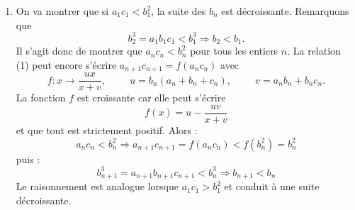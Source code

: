 \begin{enumerate}
\begin{enumerate}
\item On va montrer que si $a_1c_1<b_1^2$, la suite des $b_n$ est décroissante. Remarquons que
\begin{displaymath}
 b_2^3 = a_1b_1c_1 < b_1^3 \Rightarrow b_2 < b_1.
\end{displaymath}
Il s'agit donc de montrer que $a_nc_n<b_n^2$ pour tous les entiers $n$.\newline
La relation (1) peut encore s'écrire $a_{n+1}c_{n+1} = f(a_nc_n)$ avec 
\[
 f: x\rightarrow\frac{ux}{x+v}, \hspace{1cm} u=b_n(a_n+b_n+c_n), \hspace{1cm} v = a_nb_n + b_nc_n.
\]
La fonction $f$ est croissante car elle peut s'écrire 
\begin{displaymath}
 f(x) = u - \frac{uv}{x+v}
\end{displaymath}
et que tout est strictement positif. Alors :
\begin{displaymath}
 a_nc_n<b_n^2 \Rightarrow a_{n+1}c_{n+1} = f(a_nc_n) <f(b_n^2)= b_n^2
\end{displaymath}
puis :
\begin{displaymath}
 b_{n+1}^3= a_{n+1}b_{n+1}c_{n+1} < b_n^3 \Rightarrow b_{n+1}<b_n
\end{displaymath}
Le raisonnement est analogue lorsque $a_1c_1 > b_1^2$ et conduit à une suite décroissante.
\end{enumerate}

\end{enumerate}
